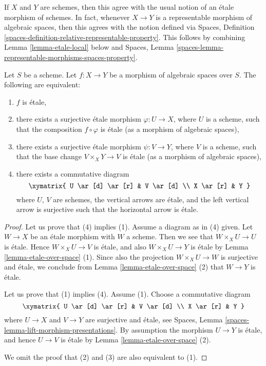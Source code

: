 \noindent
If $X$ and $Y$ are schemes, then this agree with the usual notion of an
\'etale morphism of schemes. In fact, whenever $X \to Y$ is a representable
morphism of algebraic spaces, then this agrees with the notion defined via
Spaces, Definition \ref{spaces-definition-relative-representable-property}.
This follows by combining Lemma \ref{lemma-etale-local} below and
Spaces, Lemma \ref{spaces-lemma-representable-morphisms-spaces-property}.

\begin{lemma}
\label{lemma-etale-local}
Let $S$ be a scheme.
Let $f : X \to Y$ be a morphism of algebraic spaces over $S$.
The following are equivalent:
\begin{enumerate}
\item $f$ is \'etale,
\item there exists a surjective \'etale morphism $\varphi : U \to X$,
where $U$ is a scheme, such that the composition $f \circ \varphi$ is
\'etale (as a morphism of algebraic spaces),
\item there exists a surjective \'etale morphism $\psi : V \to Y$,
where $V$ is a scheme, such that the base change $V \times_X Y \to V$
is \'etale (as a morphism of algebraic spaces),
\item there exists a commutative diagram
$$
\xymatrix{
U \ar[d] \ar[r] & V \ar[d] \\
X \ar[r] & Y
}
$$
where $U$, $V$ are schemes, the vertical arrows are \'etale, and the
left vertical arrow is surjective such that the horizontal arrow is \'etale.
\end{enumerate}
\end{lemma}

\begin{proof}
Let us prove that (4) implies (1). Assume a diagram as in (4) given.
Let $W \to X$ be an \'etale morphism with $W$ a scheme. Then we see
that $W \times_X U \to U$ is \'etale. Hence $W \times_X U \to V$ is \'etale,
and also $W \times_X U \to Y$ is \'etale by
Lemma \ref{lemma-etale-over-space} (1). Since also
the projection $W \times_X U \to W$ is surjective and \'etale, we conclude
from Lemma \ref{lemma-etale-over-space} (2) that $W \to Y$ is \'etale.

\medskip\noindent
Let us prove that (1) implies (4). Assume (1). Choose a commutative diagram
$$
\xymatrix{
U \ar[d] \ar[r] & V \ar[d] \\
X \ar[r] & Y
}
$$
where $U \to X$ and $V \to Y$ are surjective and \'etale, see
Spaces, Lemma \ref{spaces-lemma-lift-morphism-presentations}.
By assumption the morphism $U \to Y$ is \'etale,
and hence $U \to V$ is \'etale by Lemma \ref{lemma-etale-over-space} (2).

\medskip\noindent
We omit the proof that (2) and (3) are also equivalent to (1).
\end{proof}


